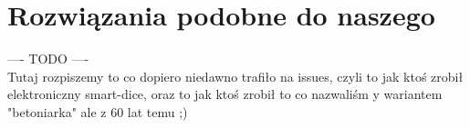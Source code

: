 \section{Rozwiązania podobne do naszego}

    ---- TODO ---- \\

Tutaj rozpiszemy to co dopiero niedawno trafiło na issues, czyli to jak ktoś zrobił elektroniczny smart-dice,
oraz to jak ktoś zrobił to co nazwaliśm y wariantem "betoniarka" ale z 60 lat temu ;)